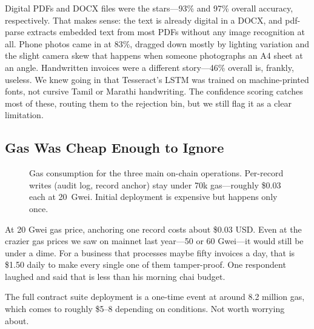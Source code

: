 \documentclass[conference]{IEEEtran}
\begin{document}
Digital PDFs and DOCX files were the stars---93\% and 97\% overall accuracy, respectively. That makes sense: the text is already digital in a DOCX, and pdf-parse extracts embedded text from most PDFs without any image recognition at all. Phone photos came in at 83\%, dragged down mostly by lighting variation and the slight camera skew that happens when someone photographs an A4 sheet at an angle. Handwritten invoices were a different story---46\% overall is, frankly, useless. We knew going in that Tesseract's LSTM was trained on machine-printed fonts, not cursive Tamil or Marathi handwriting. The confidence scoring catches most of these, routing them to the rejection bin, but we still flag it as a clear limitation.

\subsection{Gas Was Cheap Enough to Ignore}

\begin{figure}[htbp]
\begin{center}
\end{center}
\caption{Gas consumption for the three main on-chain operations. Per-record writes (audit log, record anchor) stay under 70k gas---roughly \$0.03 each at 20~Gwei. Initial deployment is expensive but happens only once.}
\label{fig_gas}
\end{figure}

At 20 Gwei gas price, anchoring one record costs about \$0.03 USD. Even at the crazier gas prices we saw on mainnet last year---50 or 60 Gwei---it would still be under a dime. For a business that processes maybe fifty invoices a day, that is \$1.50 daily to make every single one of them tamper-proof. One respondent laughed and said that is less than his morning chai budget.

The full contract suite deployment is a one-time event at around 8.2 million gas, which comes to roughly \$5--8 depending on conditions. Not worth worrying about.
\end{document}
